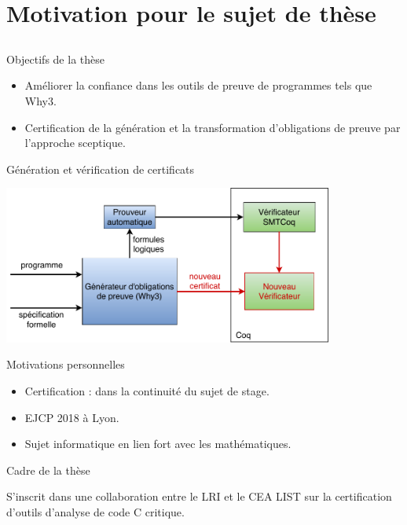 \documentclass{beamer}
\begin{document}
\section{Motivation pour le sujet de thèse}

\subsection{}

\begin{frame}{Objectifs de la thèse}

\begin{itemize}
\item Améliorer la confiance dans les outils de preuve de programmes tels que Why3.
\vspace{5mm}
\item Certification de la génération et la transformation d'obligations de preuve par l'approche sceptique.
\end{itemize}



\end{frame}

\begin{frame}{Génération et vérification de certificats}
\begin{center}
\includegraphics[height=5.2cm]{5_Contrib_These.pdf}
\end{center}
\end{frame}

\begin{frame}{Motivations personnelles}
\begin{itemize}
\item Certification : dans la continuité du sujet de stage.
\vspace{1cm}
\item EJCP 2018 à Lyon.
\vspace{1cm}
\item Sujet informatique en lien fort avec les mathématiques.
\end{itemize}
\end{frame}

\begin{frame}{Cadre de la thèse}
\begin{block}{}
\end{block}
\vspace{7mm}
S'inscrit dans une collaboration entre le LRI et le CEA LIST sur la certification d'outils d'analyse de code C critique.

\end{frame}
\end{document}

